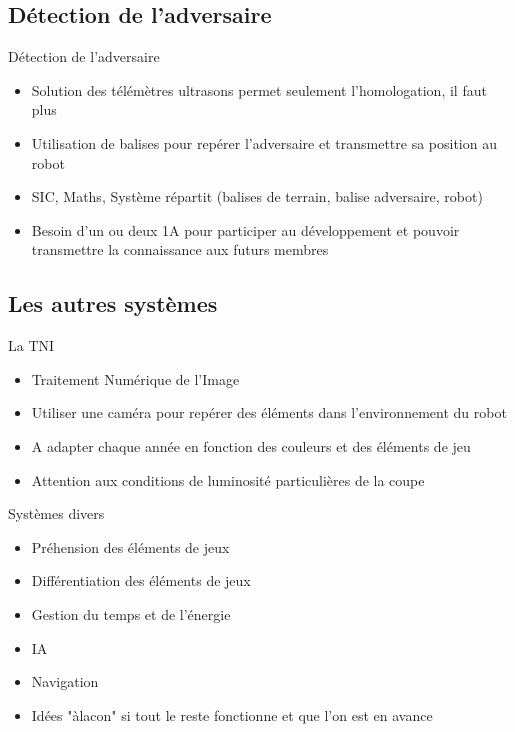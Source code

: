 \documentclass{beamer}
\begin{document}
\subsection{Détection de l'adversaire}
\begin{frame}{Détection de l'adversaire}
	\begin{itemize}
		\item Solution des télémètres ultrasons permet seulement l'homologation, il faut plus
		\item Utilisation de balises pour repérer l'adversaire et transmettre sa position au robot
		\item SIC, Maths, Système répartit (balises de terrain, balise adversaire, robot)
		\item Besoin d'un ou deux 1A pour participer au développement et pouvoir transmettre la connaissance aux futurs membres
	\end{itemize}
\end{frame}

\subsection{Les autres systèmes}
\begin{frame}{La TNI}
	\begin{itemize}
		\item Traitement Numérique de l'Image
		\item Utiliser une caméra pour repérer des éléments dans l'environnement du robot
		\item A adapter chaque année en fonction des couleurs et des éléments de jeu
		\item Attention aux conditions de luminosité particulières de la coupe
	\end{itemize}
\end{frame}

\begin{frame}{Systèmes divers}
	\begin{itemize}
		\item Préhension des éléments de jeux
		\item Différentiation des éléments de jeux
		\item Gestion du temps et de l'énergie
		\item IA
		\item Navigation
		\item Idées "àlacon" si tout le reste fonctionne et que l'on est en avance
	\end{itemize}
\end{frame}
\end{document}
